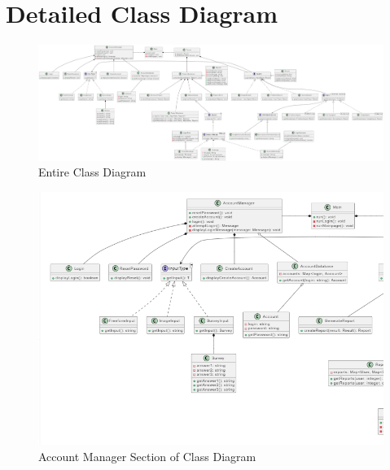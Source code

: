 \documentclass[]{article}
\numberwithin{figure}{section}
\begin{document}
\section{Detailed Class Diagram}
\label{sec:detailed_class_diagram}
\begin{figure}[h]
    \centering
    \includegraphics[scale=0.42]{classDiagram_Section4D3_group6_SFWRENG3A04.png}
    \caption{Entire Class Diagram}
    \label{fig:classDiagram_Section4D3_group6_SFWRENG3A04}
\end{figure}
\clearpage
\begin{figure}[h]
    \centering
    \includegraphics[scale=1.2]{accountManager_Section4D3_group6_SFWRENG3A04.png}
    \caption{Account Manager Section of Class Diagram}
    \label{fig:accountManager_Section4D3_group6_SFWRENG3A04}
\end{figure}
\clearpage
\end{document}
